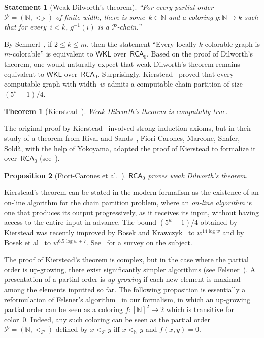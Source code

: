 \documentclass{article}
\def\P{\mathcal{P}}
\newcommand{\RCA}[0]{\mathsf{RCA}}
\newcommand{\WKL}[0]{\mathsf{WKL}}
\newcommand{\NN}[0]{\mathbb{N}}
\def\qt#1{``#1''}%
\newtheorem*{statement}{Statement}
\newtheorem{theorem}{Theorem}
\numberwithin{theorem}{section}
\newtheorem{proposition}[theorem]{Proposition}
\begin{document}
\begin{statement}[Weak Dilworth's theorem]
\qt{For every partial order $\P = (\NN, <_\P)$ of finite width, there is some~$k \in \NN$ and a coloring $g : \NN \to k$ such that for every~$i < k$, $g^{-1}(i)$ is a $\P$-chain.}
\end{statement}

By Schmerl~\cite{schmerl2000graph}, if $2 \leq k \leq m$, then the statement \qt{Every locally $k$-colorable graph is $m$-colorable} is equivalent to $\WKL$ over~$\RCA_0$. Based on the proof of Dilworth's theorem, one would naturally expect that weak Dilworth's theorem remains equivalent to $\WKL$ over~$\RCA_0$. Surprisingly, Kierstead~\cite{kierstead1981effective} proved that every computable graph with width~$w$ admits a computable chain partition of size $(5^w-1)/4$.

\begin{theorem}[Kierstead~\cite{kierstead1981effective}]
Weak Dilworth's theorem is computably true.
\end{theorem}

The original proof by Kierstead~\cite{kierstead1981effective} involved strong induction axioms, but in their study of a theorem from Rival and Sands~\cite{rival1980adjacency}, Fiori-Carones, Marcone, Shafer, Soldà, with the help of Yokoyama, adapted the proof of Kierstead to formalize it over~$\RCA_0$ (see~\cite[Theorem 3.5]{fiori2024extraordinary}).

\begin{proposition}[{Fiori-Carones et al.~\cite{fiori2024extraordinary}}]
$\RCA_0$ proves weak Dilworth's theorem.
\end{proposition}

Kierstead's theorem can be stated in the modern formalism as the existence of an on-line algorithm for the chain partition problem, where an \emph{on-line algorithm} is one that produces its output progressively, as it receives its input, without having access to the entire input in advance. The bound $(5^w-1)/4$ obtained by Kierstead was recently improved by Bosek and Krawczyk~\cite{bosek2010subexponential,bosek2015subexponential} to $w^{14\log w}$ and by Bosek et al~\cite{bosek2018subexponential} to $w^{6.5\log w+7}$. See~\cite{bosek2012online} for a survey on the subject.
\smallskip

The proof of Kierstead's theorem is complex, but in the case where the partial order is up-growing, there exist significantly simpler algorithms (see Felsner~\cite{felsner1997online}). A presentation of a partial order is \emph{up-growing} if each new element is maximal among the elements inputted so far. The following proposition is essentially a reformulation of Felsner's algorithm~\cite{felsner1997online} in our formalism, in which an up-growing partial order can be seen as a coloring $f : [\NN]^2 \to 2$ which is transitive for color~0. Indeed, any such coloring can be seen as the partial order $\P = (\NN, <_\P)$ defined by $x <_\P y$ iff $x <_\NN y$ and $f(x, y) = 0$. 
\end{document}
